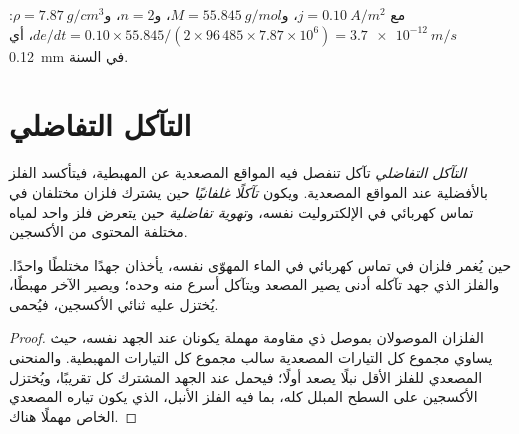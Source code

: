 \begin{example}\label{ex:b2:corrosion:rate}
مع $j = \qty{0.10}{A/m^2}$، و$M = \qty{55.845}{g/mol}$، و$n = 2$، و$\rho =
\qty{7.87}{g/cm^3}$: $de/dt = 0.10 \times 55.845/(2 \times 96\,485 \times 7.87
\times 10^6) = \qty{3.7e-12}{m/s}$، أي \qty{0.12}{mm} في السنة.
\end{example}

\section{التآكل التفاضلي}

\begin{definition}\label{def:b2:corrosion:differential}
\emph{التآكل التفاضلي} تآكل تنفصل فيه
المواقع المصعدية عن المهبطية، فيتأكسد الفلز
بالأفضلية عند المواقع المصعدية. ويكون \emph{تآكلًا
غلفانيًا} حين يشترك فلزان مختلفان في تماس
كهربائي في الإلكتروليت نفسه، و\emph{تهوية
تفاضلية} حين يتعرض فلز واحد لمياه
مختلفة المحتوى من الأكسجين.
\end{definition}

\begin{proposition}\label{prop:b2:corrosion:galvanic}
حين يُغمر فلزان في تماس كهربائي في الماء المهوّى نفسه، يأخذان
جهدًا مختلطًا واحدًا. والفلز الذي جهد تآكله أدنى
يصير المصعد ويتآكل أسرع منه وحده؛ ويصير الآخر مهبطًا،
يُختزل عليه ثنائي الأكسجين، فيُحمى.
\end{proposition}

\begin{proof}
الفلزان الموصولان بموصل ذي مقاومة مهملة يكونان عند الجهد
نفسه، حيث يساوي مجموع كل التيارات المصعدية سالب مجموع كل
التيارات المهبطية. والمنحنى المصعدي للفلز الأقل نبلًا يصعد أولًا؛
فيحمل عند الجهد المشترك كل  تقريبًا، ويُختزل
الأكسجين على السطح المبلل كله، بما فيه الفلز الأنبل،
الذي يكون تياره المصعدي الخاص مهملًا هناك.
\end{proof}

